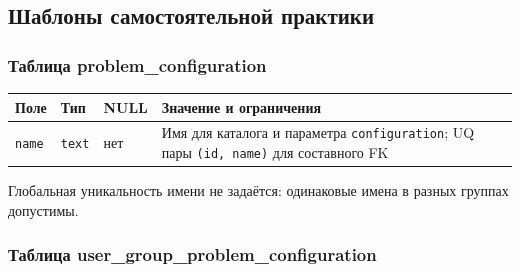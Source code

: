 \documentclass[12pt,a4paper]{article}
\newcounter{none} %
\begin{document}
\subsection{Шаблоны самостоятельной практики}\label{ux448ux430ux431ux43bux43eux43dux44b-ux441ux430ux43cux43eux441ux442ux43eux44fux442ux435ux43bux44cux43dux43eux439-ux43fux440ux430ux43aux442ux438ux43aux438}

\hypertarget{шаблоны-самостоятельной-практики}{}

\subsubsection{Таблица problem\_configuration}\label{ux442ux430ux431ux43bux438ux446ux430-problem_configuration}

\hypertarget{таблица-problem_configuration}{}

{\def\LTcaptype{none} %
\begin{longtable}[]{@{}
  >{\raggedright\arraybackslash}p{}
  >{\raggedright\arraybackslash}p{}
  >{\raggedright\arraybackslash}p{}
  >{\raggedright\arraybackslash}p{}@{}}
\toprule\noalign{}
\begin{minipage}[b]{\linewidth}\raggedright
Поле
\end{minipage} & \begin{minipage}[b]{\linewidth}\raggedright
Тип
\end{minipage} & \begin{minipage}[b]{\linewidth}\raggedright
NULL
\end{minipage} & \begin{minipage}[b]{\linewidth}\raggedright
Значение и ограничения
\end{minipage} \\
\midrule\noalign{}
\endhead
\bottomrule\noalign{}
\endlastfoot
\texttt{name} & \texttt{text} & нет & Имя для каталога и параметра \texttt{configuration}; UQ пары \texttt{(id,\ name)} для составного FK \\
\end{longtable}
}

Глобальная уникальность имени не задаётся: одинаковые имена в разных группах допустимы.

\subsubsection{Таблица user\_group\_problem\_configuration}\label{ux442ux430ux431ux43bux438ux446ux430-user_group_problem_configuration}
\end{document}
